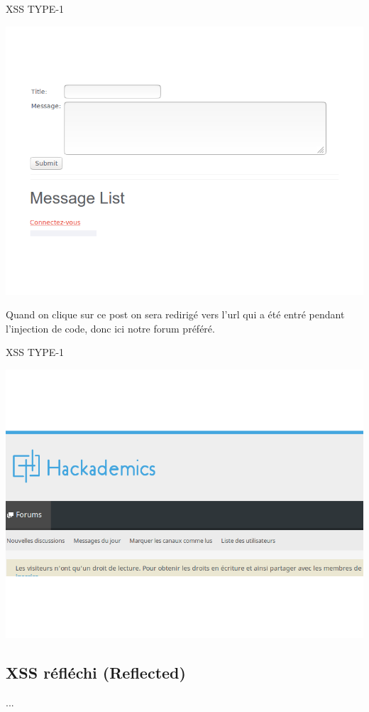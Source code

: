 \begin{center}
\caption{XSS TYPE-1}
\includegraphics[scale=0.3]{Web/assets/xsst101.png}
\end{center}

\bigskip

\begin{flushleft}
Quand on clique sur ce post on sera redirigé vers l’url qui a été entré pendant l’injection de code, donc ici notre forum préféré.
\end{flushleft}

\begin{center}
\caption{XSS TYPE-1}
\includegraphics[scale=0.3]{Web/assets/xssha.png}
\end{center}

\bigskip

\subsection{XSS réfléchi (Reflected)}\label{vulnerabilites:web:xss:reflected}

...

\endinput
